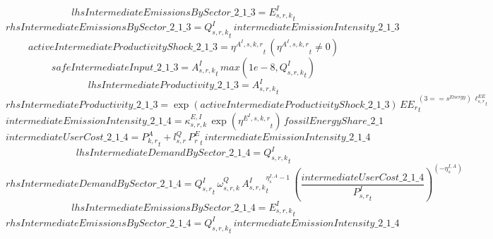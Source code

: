 \begin{dmath*}
lhsIntermediateEmissionsBySector\_2\_1\_3 = {{E^I_{s,r,k}}}_{t}
\end{dmath*}
\begin{dmath*}
rhsIntermediateEmissionsBySector\_2\_1\_3 = {{Q^{I}_{s,r,k}}}_{t}\, {intermediateEmissionIntensity\_2\_1\_3}
\end{dmath*}
\begin{dmath*}
activeIntermediateProductivityShock\_2\_1\_3 = {{\eta^{A^{I},s,k,r}}}_{t}\, \left({{\eta^{A^{I},s,k,r}}}_{t}\neq 0\right)
\end{dmath*}
\begin{dmath*}
safeIntermediateInput\_2\_1\_3 = {{A^{I}_{s,r,k}}}_{t}\, max(1e-8,{{Q^{I}_{s,r,k}}}_{t})
\end{dmath*}
\begin{dmath*}
lhsIntermediateProductivity\_2\_1\_3 = {{A^{I}_{s,r,k}}}_{t}
\end{dmath*}
\begin{dmath*}
rhsIntermediateProductivity\_2\_1\_3 = \exp\left({activeIntermediateProductivityShock\_2\_1\_3}\right)\, {{EE_r}}_{t}^{\left(3=={{s^{Energy}}}\right)\, {{\ell^{EE}_{s,r}}}_{t}}
\end{dmath*}
\begin{dmath*}
intermediateEmissionIntensity\_2\_1\_4 = {{\kappa^{E,I}_{s,r,k}}}\, \exp\left({{\eta^{E^{I},s,k,r}}}_{t}\right)\, {fossilEnergyShare\_2\_1}
\end{dmath*}
\begin{dmath*}
intermediateUserCost\_2\_1\_4 = {{P^{A}_{k,r}}}_{t}+{{l^{Q}_{s,r}}}\, {{P^E_r}}_{t}\, {intermediateEmissionIntensity\_2\_1\_4}
\end{dmath*}
\begin{dmath*}
lhsIntermediateDemandBySector\_2\_1\_4 = {{Q^{I}_{s,r,k}}}_{t}
\end{dmath*}
\begin{dmath*}
rhsIntermediateDemandBySector\_2\_1\_4 = {{Q^{I}_{s,r}}}_{t}\, {{\omega^{Q}_{s,r,k}}}\, {{A^{I}_{s,r,k}}}_{t}^{{{\eta^{I,A}_{s}}}-1}\, \left(\frac{{intermediateUserCost\_2\_1\_4}}{{{P^{I}_{s,r}}}_{t}}\right)^{\left(-{{\eta^{I,A}_{s}}}\right)}
\end{dmath*}
\begin{dmath*}
lhsIntermediateEmissionsBySector\_2\_1\_4 = {{E^I_{s,r,k}}}_{t}
\end{dmath*}
\begin{dmath*}
rhsIntermediateEmissionsBySector\_2\_1\_4 = {{Q^{I}_{s,r,k}}}_{t}\, {intermediateEmissionIntensity\_2\_1\_4}
\end{dmath*}

